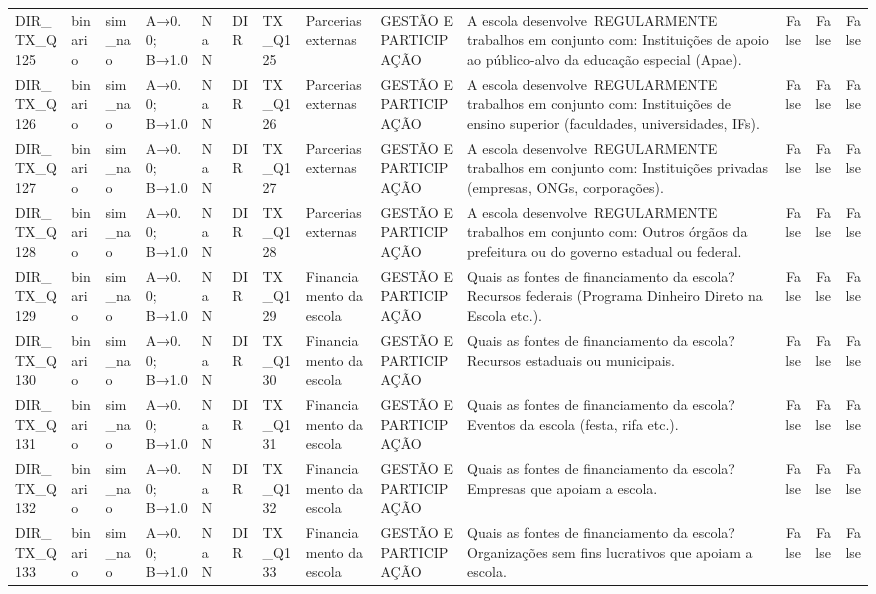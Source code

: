 \begin{tabular}{llllllllllrrr}
DIR\_TX\_Q125 & binario & sim\_nao & A→0.0; B→1.0 & NaN & DIR & TX\_Q125 & Parcerias externas & GESTÃO E PARTICIPAÇÃO & A escola desenvolve REGULARMENTE trabalhos em conjunto com: Instituições de apoio ao público-alvo da educação especial (Apae). & False & False & False \\
DIR\_TX\_Q126 & binario & sim\_nao & A→0.0; B→1.0 & NaN & DIR & TX\_Q126 & Parcerias externas & GESTÃO E PARTICIPAÇÃO & A escola desenvolve REGULARMENTE trabalhos em conjunto com: Instituições de ensino superior (faculdades, universidades, IFs). & False & False & False \\
DIR\_TX\_Q127 & binario & sim\_nao & A→0.0; B→1.0 & NaN & DIR & TX\_Q127 & Parcerias externas & GESTÃO E PARTICIPAÇÃO & A escola desenvolve REGULARMENTE trabalhos em conjunto com: Instituições privadas (empresas, ONGs, corporações). & False & False & False \\
DIR\_TX\_Q128 & binario & sim\_nao & A→0.0; B→1.0 & NaN & DIR & TX\_Q128 & Parcerias externas & GESTÃO E PARTICIPAÇÃO & A escola desenvolve REGULARMENTE trabalhos em conjunto com: Outros órgãos da prefeitura ou do governo estadual ou federal. & False & False & False \\
DIR\_TX\_Q129 & binario & sim\_nao & A→0.0; B→1.0 & NaN & DIR & TX\_Q129 & Financiamento da escola & GESTÃO E PARTICIPAÇÃO & Quais as fontes de financiamento da escola? Recursos federais (Programa Dinheiro Direto na Escola etc.). & False & False & False \\
DIR\_TX\_Q130 & binario & sim\_nao & A→0.0; B→1.0 & NaN & DIR & TX\_Q130 & Financiamento da escola & GESTÃO E PARTICIPAÇÃO & Quais as fontes de financiamento da escola? Recursos estaduais ou municipais. & False & False & False \\
DIR\_TX\_Q131 & binario & sim\_nao & A→0.0; B→1.0 & NaN & DIR & TX\_Q131 & Financiamento da escola & GESTÃO E PARTICIPAÇÃO & Quais as fontes de financiamento da escola? Eventos da escola (festa, rifa etc.). & False & False & False \\
DIR\_TX\_Q132 & binario & sim\_nao & A→0.0; B→1.0 & NaN & DIR & TX\_Q132 & Financiamento da escola & GESTÃO E PARTICIPAÇÃO & Quais as fontes de financiamento da escola? Empresas que apoiam a escola. & False & False & False \\
DIR\_TX\_Q133 & binario & sim\_nao & A→0.0; B→1.0 & NaN & DIR & TX\_Q133 & Financiamento da escola & GESTÃO E PARTICIPAÇÃO & Quais as fontes de financiamento da escola? Organizações sem fins lucrativos que apoiam a escola. & False & False & False \\

\end{tabular}
